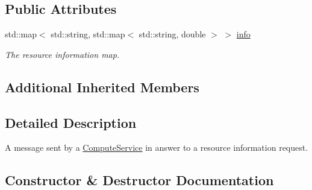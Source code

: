 \subsection*{Public Attributes}
\begin{DoxyCompactItemize}
\item 
\mbox{\label{classwrench_1_1_compute_service_resource_information_answer_message_a5fb24a3f72650e6edcc24faece988660}} 
std\+::map$<$ std\+::string, std\+::map$<$ std\+::string, double $>$ $>$ \hyperlink{classwrench_1_1_compute_service_resource_information_answer_message_a5fb24a3f72650e6edcc24faece988660}{info}
\begin{DoxyCompactList}\small\item\em The resource information map. \end{DoxyCompactList}\end{DoxyCompactItemize}
\subsection*{Additional Inherited Members}


\subsection{Detailed Description}
A message sent by a \hyperlink{classwrench_1_1_compute_service}{Compute\+Service} in answer to a resource information request. 

\subsection{Constructor \& Destructor Documentation}
\mbox{\label{classwrench_1_1_compute_service_resource_information_answer_message_a971d9d17b936818b5ec1fa7c85e9cb96}} 
